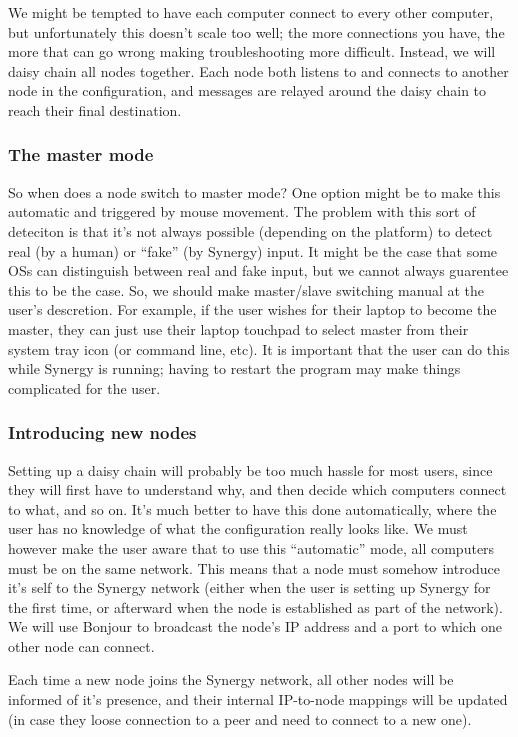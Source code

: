 We might be tempted to have each computer connect to every other computer, but
unfortunately this doesn't scale too well; the more connections you have, the
more that can go wrong making troubleshooting more difficult. Instead, we will
daisy chain all nodes together. Each node both listens to and connects to 
another node in the configuration, and messages are relayed around the daisy
chain to reach their final destination.

\subsubsection{The master mode}

So when does a node switch to master mode? One option might be to make this
automatic and triggered by mouse movement. The problem with this sort of
deteciton is that it's not always possible (depending on the platform) to
detect real (by a human) or ``fake'' (by Synergy) input. It might be the
case that some OSs can distinguish between real and fake input, but we cannot
always guarentee this to be the case. So, we should make master/slave switching
manual at the user's descretion. For example, if the user wishes for their
laptop to become the master, they can just use their laptop touchpad to
select master from their system tray icon (or command line, etc). It is
important that the user can do this while Synergy is running; having to restart
the program may make things complicated for the user.

\subsubsection{Introducing new nodes}

Setting up a daisy chain will probably be too much hassle for most users,
since they will first have to understand why, and then decide which computers
connect to what, and so on. It's much better to have this done automatically,
where the user has no knowledge of what the configuration really looks like.
We must however make the user aware that to use this ``automatic'' mode, all
computers must be on the same network. This means that a node must somehow
introduce it's self to the Synergy network (either when the user is setting 
up Synergy for the first time, or afterward when the node is established
as part of the network). We will use Bonjour to broadcast the node's IP address
and a port to which one other node can connect.

Each time a new node joins the Synergy network, all other nodes will be informed
of it's presence, and their internal IP-to-node mappings will be updated (in 
case they loose connection to a peer and need to connect to a new one).

